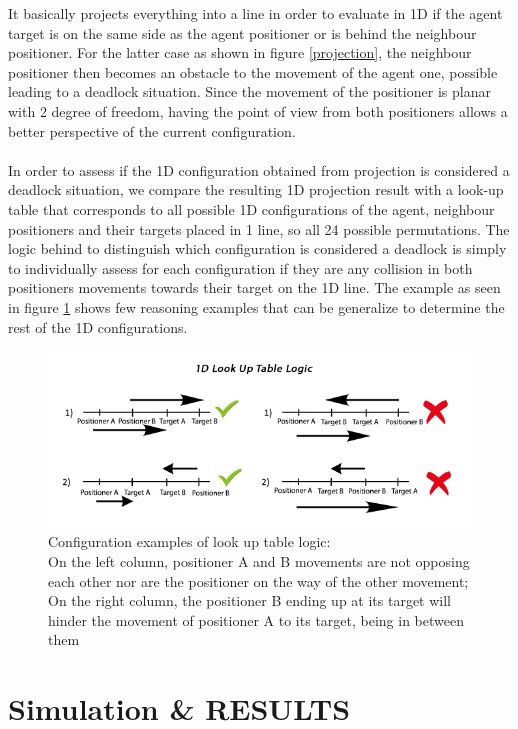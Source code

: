 \documentclass[]{spie}  %
\begin{document}
	It basically projects everything into a line in order to evaluate in 1D if the agent target is on the same side as the agent positioner or is behind the neighbour positioner. For the latter case as shown in figure \ref{projection}, the neighbour positioner then becomes an obstacle to the movement of the agent one, possible leading to a deadlock situation.
	Since the movement of the positioner is planar with 2 degree of freedom, having the point of view from both positioners allows a better perspective of the current configuration.\\\\
	In order to assess if the 1D configuration obtained from projection is considered a deadlock situation, we compare the resulting 1D projection result with a look-up table that corresponds to all possible 1D configurations of the agent, neighbour positioners and their targets placed in 1 line, so all 24 possible permutations.
	The logic behind to distinguish which configuration is considered a deadlock is simply to individually assess for each configuration if they are any collision in both positioners movements towards their target on the 1D line. The example as seen in figure \ref{look_UpTableLogic} shows few reasoning examples that can be generalize to determine the rest of the 1D configurations.
	\begin{figure}[H]
		\centering
		\includegraphics[scale=0.55]{images/1DLookUpTable.jpg}
		\caption{\centering
			 Configuration examples of look up table logic:\\
			On the left column, positioner A and B movements are not opposing each other nor are the positioner on the way of the other movement; 
			On the right column,  the positioner B ending up at its target will hinder the movement of positioner A to its target, being in between them }
		\label{look_UpTableLogic}
	\end{figure}
	\section{Simulation \& RESULTS}
	\label{RESULTS}
\end{document}
